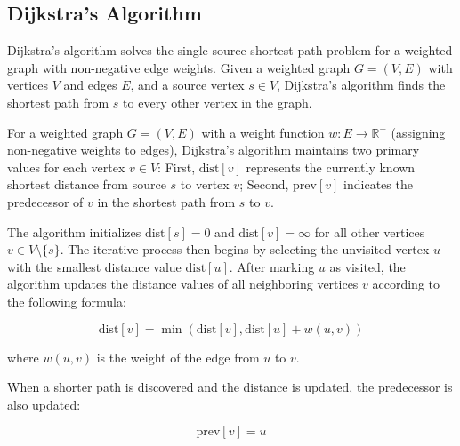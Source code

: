 \subsection{Dijkstra's Algorithm}
\label{subsec:DijkstrasAlgorithm}

Dijkstra's algorithm solves the single-source shortest path problem for a weighted graph with non-negative edge weights. Given a weighted graph $G = (V, E)$ with vertices $V$ and edges $E$, and a source vertex $s \in V$, Dijkstra's algorithm finds the shortest path from $s$ to every other vertex in the graph.

For a weighted graph $G = (V, E)$ with a weight function $w: E \rightarrow \mathbb{R}^+$ (assigning non-negative weights to edges), Dijkstra's algorithm maintains two primary values for each vertex $v \in V$: First, $\text{dist}[v]$ represents the currently known shortest distance from source $s$ to vertex $v$; Second, $\text{prev}[v]$ indicates the predecessor of $v$ in the shortest path from $s$ to $v$.

The algorithm initializes $\text{dist}[s] = 0$ and $\text{dist}[v] = \infty$ for all other vertices $v \in V \setminus \{s\}$. The iterative process then begins by selecting the unvisited vertex $u$ with the smallest distance value $\text{dist}[u]$. After marking $u$ as visited, the algorithm updates the distance values of all neighboring vertices $v$ according to the following formula:

\begin{equation}
\text{dist}[v] = \min(\text{dist}[v], \text{dist}[u] + w(u, v))
\end{equation}

where $w(u, v)$ is the weight of the edge from $u$ to $v$.

When a shorter path is discovered and the distance is updated, the predecessor is also updated:

\begin{equation}
\text{prev}[v] = u
\end{equation}

